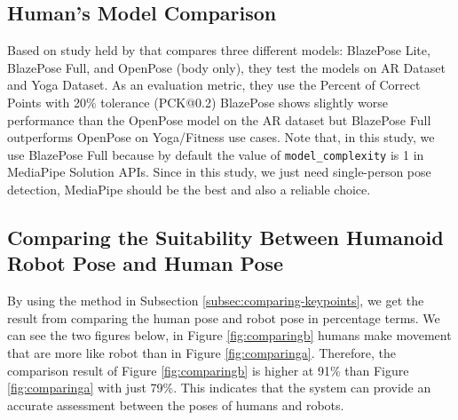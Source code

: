 \subsection{Human's Model Comparison}
\label{subsec:humanmodelcomparison}

Based on study held by \citet{bazarevsky2020} that compares three different models: BlazePose Lite, BlazePose Full, and OpenPose (body only), they test the models on AR Dataset and Yoga Dataset. As an evaluation metric, they use the Percent of Correct Points with 20\% tolerance (PCK@0.2)
BlazePose shows slightly worse performance than the OpenPose model on the AR dataset but BlazePose Full outperforms OpenPose on Yoga/Fitness use cases.
Note that, in this study, we use BlazePose Full because by default the value of \verb|model_complexity| is 1 in MediaPipe Solution APIs.
Since in this study, we just need single-person pose detection, MediaPipe should be the best and also a reliable choice.

\subsection{Comparing the Suitability Between Humanoid Robot Pose and Human Pose}
\label{subsec:comparingsuitability}

By using the method in Subsection \ref{subsec:comparing-keypoints}, we get the result from comparing the human pose and robot pose in percentage terms.
We can see the two figures below, in Figure \ref{fig:comparingb} humans make movement that are more like robot than in Figure \ref{fig:comparinga}.
Therefore, the comparison result of Figure \ref{fig:comparingb} is higher at 91\% than Figure \ref{fig:comparinga} with just 79\%.
This indicates that the system can provide an accurate assessment between the poses of humans and robots.

